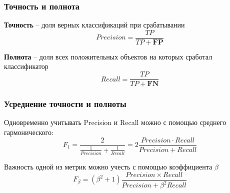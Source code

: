 \documentclass{beamer}
\begin{document}
	\begin{frame}
		\frametitle{Точность и полнота}
		
		\textbf{Точность} -- доля верных классификаций при срабатывании
		\[
		Precision = \frac{TP}{TP + \textbf{FP}}
		\]
		
		\textbf{Полнота} -- доля всех положительных объектов на которых сработал классификатор
		\[
		Recall = \frac{TP}{TP + \textbf{FN}}
		\]
	\end{frame}
	
	\begin{frame}
		\frametitle{Усреднение точности и полноты}
		Одновременно учитывать Precision и Recall можно с помощью среднего гармонического:
		\[
		F_1 = \frac{2}{\frac{1}{Precision} + \frac{1}{Recall}} =
		2 \frac{Precision \cdot Recall}{Precision + Recall}
		\]
		
		Важность одной из метрик можно учесть с помощью коэффициента $\beta$
		\[
		F_{\beta} = (\beta^2 + 1) \frac{Precision \times Recall}{Precision + \beta^2 Recall}
		\]
	\end{frame}
	
\end{document}
